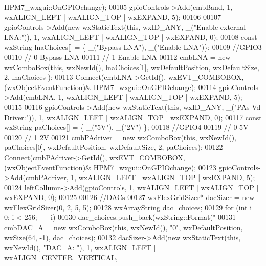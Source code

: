 \begin{DoxyCode}
{{      HPM7_wxgui::OnGPIOchange);
00105     gpioControls->Add(cmbBand, 1, wxALIGN\_LEFT | wxALIGN\_TOP | wxEXPAND, 5);
00106 
00107     gpioControls->Add(\textcolor{keyword}{new} wxStaticText(\textcolor{keyword}{this}, wxID\_ANY, \_(\textcolor{stringliteral}{"Enable external LNA:"})), 1, wxALIGN\_LEFT | 
      wxALIGN\_TOP | wxEXPAND, 0);
00108     \textcolor{keyword}{const} wxString lnaChoices[] = \{ \_(\textcolor{stringliteral}{"Bypass LNA"}), \_(\textcolor{stringliteral}{"Enable LNA"})\};
00109     \textcolor{comment}{//GPIO3}
00110     \textcolor{comment}{//  0  Bypass LNA}
00111     \textcolor{comment}{//  1  Enable LNA}
00112     cmbLNA = \textcolor{keyword}{new} wxComboBox(\textcolor{keyword}{this}, wxNewId(), lnaChoices[1], wxDefaultPosition, wxDefaultSize, 2, lnaChoices
      );
00113     Connect(cmbLNA->GetId(), wxEVT\_COMBOBOX, (wxObjectEventFunction)&
      HPM7_wxgui::OnGPIOchange);
00114     gpioControls->Add(cmbLNA, 1, wxALIGN\_LEFT | wxALIGN\_TOP | wxEXPAND, 5);
00115 
00116     gpioControls->Add(\textcolor{keyword}{new} wxStaticText(\textcolor{keyword}{this}, wxID\_ANY, \_(\textcolor{stringliteral}{"PAs Vd Driver:"})), 1, wxALIGN\_LEFT | wxALIGN\_TOP 
      | wxEXPAND, 0);
00117     \textcolor{keyword}{const} wxString paChoices[] = \{ \_(\textcolor{stringliteral}{"5V"}), \_(\textcolor{stringliteral}{"2V"}) \};
00118     \textcolor{comment}{//GPIO4}
00119     \textcolor{comment}{//  0  5V}
00120     \textcolor{comment}{//  1  2V}
00121     cmbPAdriver = \textcolor{keyword}{new} wxComboBox(\textcolor{keyword}{this}, wxNewId(), paChoices[0], wxDefaultPosition, wxDefaultSize, 2, 
      paChoices);
00122     Connect(cmbPAdriver->GetId(), wxEVT\_COMBOBOX, (wxObjectEventFunction)&
      HPM7_wxgui::OnGPIOchange);
00123     gpioControls->Add(cmbPAdriver, 1, wxALIGN\_LEFT | wxALIGN\_TOP | wxEXPAND, 5);
00124     leftCollumn->Add(gpioControls, 1, wxALIGN\_LEFT | wxALIGN\_TOP | wxEXPAND, 0);
00125 
00126     \textcolor{comment}{//DACs}
00127     wxFlexGridSizer* dacSizer = \textcolor{keyword}{new} wxFlexGridSizer(0, 2, 5, 5);
00128     wxArrayString dac\_choices;
00129     \textcolor{keywordflow}{for} (\textcolor{keywordtype}{int} i = 0; i < 256; ++i)
00130         dac\_choices.push\_back(wxString::Format(\textcolor{stringliteral}{"%
00131     cmbDAC\_A = \textcolor{keyword}{new} wxComboBox(\textcolor{keyword}{this}, wxNewId(), \textcolor{stringliteral}{"0"}, wxDefaultPosition, wxSize(64, -1), dac\_choices);
00132     dacSizer->Add(\textcolor{keyword}{new} wxStaticText(\textcolor{keyword}{this}, wxNewId(), \textcolor{stringliteral}{"DAC\_A: "}), 1, wxALIGN\_LEFT | wxALIGN\_CENTER\_VERTICAL, 
}}}
\end{DoxyCode}
